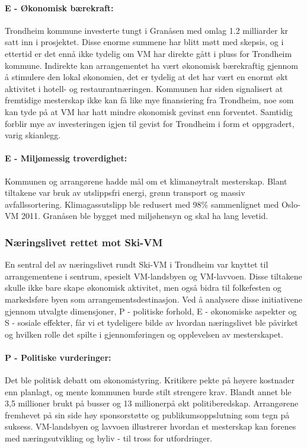 \paragraph{E - Økonomisk bærekraft:} Trondheim kommune investerte tungt i Granåsen med omlag 1.2 
milliarder kr satt inn i prosjektet\cite{NRK12Milliarder}. Disse enorme summene har blitt møtt med skepsis,
og i ettertid er det ennå ikke tydelig om VM har direkte gått i pluss for Trondheim kommune\cite{AftenpostenNyVM}. 
Indirekte kan arrangementet ha vært økonomisk bærekraftig gjennom å stimulere den lokal 
økonomien, det er tydelig at det har vært en enormt økt aktivitet i hotell- og 
restaurantnæringen\cite{DagbladetPriser}. Kommunen har siden signalisert at fremtidige mesterskap ikke
kan få like mye finansiering fra Trondheim\cite{NeaRadioVM}, noe som kan tyde på at VM har hatt mindre økonomisk 
gevinst enn forventet. Samtidig forblir mye av investeringen igjen til gevist for Trondheim i form 
et oppgradert, varig skianlegg.

\paragraph{E - Miljømessig troverdighet:} Kommunen og arrangørene hadde mål om et klimanøytralt 
mesterskap\cite{TrondheimKommuneVM}. Blant tiltakene var bruk av utslippsfri energi, grønn 
transport og massiv avfallssortering. Klimagassutslipp ble redusert med 98\% sammenlignet 
med Oslo-VM 2011\cite{Trondheim2025Kutt}. Granåsen ble bygget med miljøhensyn og skal ha lang levetid. 


\subsubsection{Næringslivet rettet mot Ski-VM}
En sentral del av næringslivet rundt Ski-VM i Trondheim var knyttet til arrangementene i sentrum, 
spesielt VM-landsbyen og VM-lavvoen. Disse tiltakene skulle ikke bare skape økonomisk aktivitet, 
men også bidra til folkefesten og markedsføre byen som arrangementsdestinasjon. Ved å analysere 
disse initiativene gjennom utvalgte dimensjoner, P - politiske forhold, E - økonomiske aspekter og 
S - sosiale effekter, får vi et tydeligere bilde av hvordan næringslivet ble påvirket og hvilken 
rolle det spilte i gjennomføringen og opplevelsen av mesterskapet.

\paragraph{P - Politiske vurderinger:}
Det ble politisk debatt om økonomistyring. Kritikere pekte på høyere kostnader enn planlagt, 
og mente kommunen burde stilt strengere krav. Blandt annet ble 3,5 millioner brukt på busser og 13 
millionerpå økt politiberedskap. Arrangørene fremhevet på sin side høy sponsorstøtte og 
publikumsoppslutning som tegn på suksess. VM-landsbyen og lavvoen illustrerer hvordan 
et mesterskap kan forenes med næringsutvikling og byliv - til tross for utfordringer.



